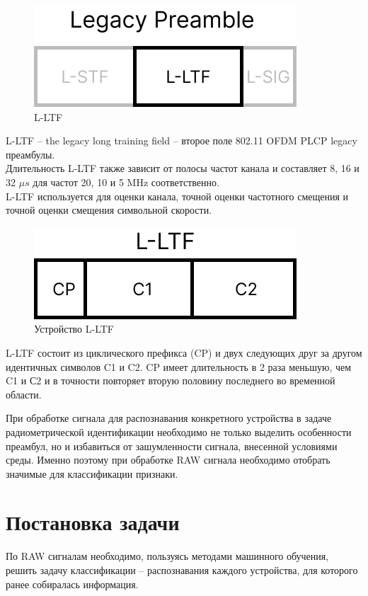         \par
            \begin{figure}[h!]
                \centering
                \includegraphics[scale=0.5]{pictures/L-LTF.png}
                \caption{L-LTF}
                \label{fig:my_label}
            \end{figure} 
            L-LTF -- the legacy long training field -- второе поле 802.11 OFDM PLCP legacy преамбулы.\\
            \noindent
            Длительность L-LTF также зависит от полосы частот канала и составляет 8, 16 и 32 $\mu s$ для частот 20, 10 и 5 MHz соответственно.\\
            \noindent
            L-LTF используется для оценки канала, точной оценки частотного смещения и точной оценки смещения символьной скорости.\\
        \newpage
            \begin{figure}[h!]
                \centering
                \includegraphics[scale=0.4]{pictures/L-LTF-1.png}
                \caption{Устройство L-LTF}
                \label{fig:my_label}
            \end{figure} 
        
        \par
            L-LTF состоит из циклического префикса (CP) и двух следующих друг за другом идентичных символов C1 и C2. CP имеет длительность в 2 раза меньшую, чем C1 и С2 и в точности повторяет вторую половину последнего во временной области. 
            
            
        
        \par
            При обработке сигнала для распознавания конкретного устройства в задаче радиометрической идентификации необходимо не только выделить особенности преамбул, но и избавиться от зашумленности сигнала, внесенной условиями среды. Именно поэтому при обработке RAW сигнала необходимо отобрать значимые для классификации признаки.
            
        \par
            
        
    \section{Постановка задачи}
    
        По RAW сигналам необходимо, пользуясь методами машинного обучения, решить задачу классификации -- распознавания каждого устройства, для которого ранее собиралась информация.
        
        
        
    
     



